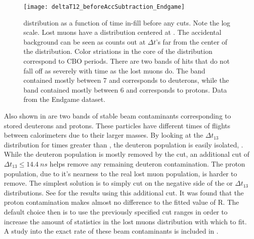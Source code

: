
\begin{figure}[]
\centering
        \texttt{[image: deltaT12\_beforeAccSubtraction\_Endgame]}
\caption[Lost muon \DT distribution as a function of time in-fill]{\DT distribution as a function of time in-fill before any cuts. Note the log scale. Lost muons have a \DT distribution centered at . The accidental background can be seen as counts out at $\Delta t$'s far from the center of the distribution. Color striations in the core of the distribution correspond to CBO periods. There are two bands of hits that do not fall off as severely with time as the lost muons do. The band contained mostly between 7 and  corresponds to deuterons, while the band contained mostly between 6 and  corresponds to protons. Data from the Endgame dataset.}
\label{fig:deltaT12_AccSub}
\end{figure}


Also shown in  are two bands of stable beam contaminants corresponding to stored deuterons and protons. These particles have different times of flights between calorimeters due to their larger masses. By looking at the $\Delta t_{13}$ distribution for times greater than , the deuteron population is easily isolated, . While the deuteron population is mostly removed by the \DT cut, an additional cut of $\Delta t_{13} \leq \SI{14.4}{ns}$ helps remove any remaining deuteron contamination. The proton population, due to it's nearness to the real lost muon population, is harder to remove. The simplest solution is to simply cut on the negative side of the \DT or $\Delta t_{13}$ distributions. See  for the results using this additional cut. It was found that the proton contamination makes almost no difference to the fitted value of R. The default choice then is to use the previously specified cut ranges in order to increase the amount of statistics in the lost muons distribution with which to fit. A study into the exact rate of these beam contaminants is included in .


